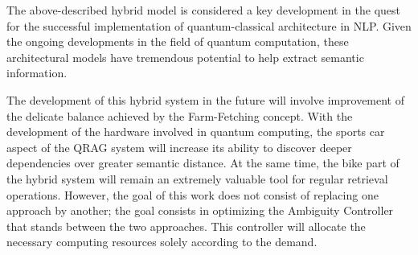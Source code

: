 \bigskip\noindent
The above-described hybrid model is considered a key development in the quest for the successful implementation of quantum-classical architecture in NLP. Given the ongoing developments in the field of quantum computation, these architectural models have tremendous potential to help extract semantic information.

The development of this hybrid system in the future will involve improvement of the delicate balance achieved by the Farm-Fetching concept. With the development of the hardware involved in quantum computing, the sports car aspect of the QRAG system will increase its ability to discover deeper dependencies over greater semantic distance. At the same time, the bike part of the hybrid system will remain an extremely valuable tool for regular retrieval operations. However, the goal of this work does not consist of replacing one approach by another; the goal consists in optimizing the Ambiguity Controller that stands between the two approaches. This controller will allocate the necessary computing resources solely according to the demand.